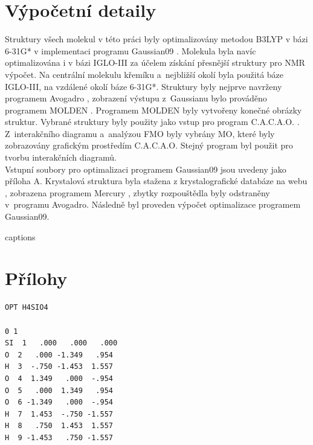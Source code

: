 \documentclass[
  printed, %
  table,   %
  lof,     %
  lot,     %
  oneside,
]{fithesis3}
\begin{document}
  \chapter{Výpočetní detaily}
  Struktury všech molekul v této práci byly optimalizovány metodou B3LYP v bázi 6-31G* v implementaci programu Gaussian09 \cite{g09}. Molekula  byla navíc optimalizována i v bázi IGLO-III \cite{EMSL} za účelem získání přesnější struktury pro NMR výpočet. Na centrální molekulu křemíku a~nejbližší okolí byla použitá báze IGLO-III, na vzdálené okolí báze 6-31G*. Struktury byly nejprve navrženy programem Avogadro \cite{Avogadro}, zobrazení výstupu z~Gaussianu  bylo prováděno programem MOLDEN \cite{Molden}. Programem MOLDEN byly vytvořeny konečné obrázky struktur. Vybrané struktury byly použity jako vstup pro program C.A.C.A.O. \cite{cacao}. Z~interakčního diagramu a~analýzou FMO byly vybrány MO, které byly zobrazovány grafickým prostředím C.A.C.A.O. Stejný program byl použit pro tvorbu interakčních diagramů. \\
Vstupní soubory pro optimalizaci programem Gaussian09 jsou uvedeny jako příloha A. Krystalová struktura  byla stažena z krystalografické databáze na webu \cite{CCDC}, zobrazena programem Mercury \cite{Mercury}, zbytky rozpouštědla byly odstraněny v~programu Avogadro. Následně byl proveden výpočet optimalizace programem Gaussian09.



  
{\csname captions\languagename\endcsname %
\makeatletter %
  \thesis@selectLocale{\thesis@locale}\makeatother
\printbibliography[heading=bibintoc]} %
\appendix %


\chapter{Přílohy}
 \begin{lstlisting}[frame=single, caption={\ce{H4SiO4} },label=DescriptiveLabel]
OPT H4SIO4 

0 1
SI  1   .000   .000   .000 
O  2   .000 -1.349   .954 
H  3  -.750 -1.453  1.557 
O  4  1.349   .000  -.954 
O  5   .000  1.349   .954 
O  6 -1.349   .000  -.954 
H  7  1.453  -.750 -1.557 
H  8   .750  1.453  1.557 
H  9 -1.453   .750 -1.557 
 \end{lstlisting}
\end{document}

